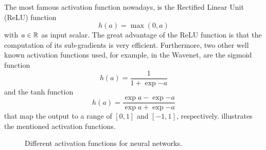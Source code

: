 The most famous activation function nowadays, is the Rectified Linear Unit (ReLU) \cite{Zeiler2013_relu} function
\begin{equation}\label{eq:nn_theory_relu}
  h(a) = \max{(0, a)}
\end{equation}
with $a \in \mathbb{R}$ as input scalar.
The great advantage of the ReLU function is that the computation of its sub-gradients is very efficient.
Furthermore, two other well known activation functions used, for example, in the Wavenet, are the sigmoid function
\begin{equation}\label{eq:nn_theory_sigmoid}
  h(a) = \frac{1}{1 + \exp{-a}}
\end{equation}
and the tanh function
\begin{equation}\label{eq:nn_theory_tanh}
  h(a) = \frac{\exp{a} - \exp{-a}}{\exp{a} + \exp{-a}}
\end{equation}
that map the output to a range of $[0, 1]$ and $[-1, 1]$, respectively.
 illustrates the mentioned activation functions.
\begin{figure}[!ht]
  \centering
    \quad
    \quad
  \caption{Different activation functions for neural networks.}
  \label{fig:nn_theory_activation}
\end{figure}
\FloatBarrier
\noindent



